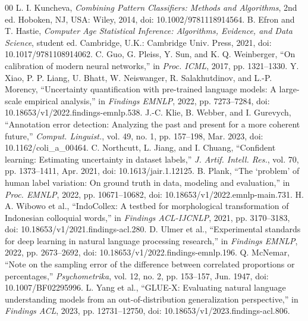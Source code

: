 \begin{thebibliography}{00}
 L. I. Kuncheva, \emph{Combining Pattern Classifiers: Methods and Algorithms}, 2nd ed. Hoboken, NJ, USA: Wiley, 2014, doi: 10.1002/9781118914564.
 B. Efron and T. Hastie, \emph{Computer Age Statistical Inference: Algorithms, Evidence, and Data Science}, student ed. Cambridge, U.K.: Cambridge Univ. Press, 2021, doi: 10.1017/9781108914062.
 C. Guo, G. Pleiss, Y. Sun, and K. Q. Weinberger, ``On calibration of modern neural networks,'' in \emph{Proc. ICML}, 2017, pp. 1321--1330.
 Y. Xiao, P. P. Liang, U. Bhatt, W. Neiswanger, R. Salakhutdinov, and L.-P. Morency, ``Uncertainty quantification with pre-trained language models: A large-scale empirical analysis,'' in \emph{Findings EMNLP}, 2022, pp. 7273--7284, doi: 10.18653/v1/2022.findings-emnlp.538.
 J.-C. Klie, B. Webber, and I. Gurevych, ``Annotation error detection: Analyzing the past and present for a more coherent future,'' \emph{Comput. Linguist.}, vol. 49, no. 1, pp. 157--198, Mar. 2023, doi: 10.1162/coli\_a\_00464.
 C. Northcutt, L. Jiang, and I. Chuang, ``Confident learning: Estimating uncertainty in dataset labels,'' \emph{J. Artif. Intell. Res.}, vol. 70, pp. 1373--1411, Apr. 2021, doi: 10.1613/jair.1.12125.
 B. Plank, ``The `problem' of human label variation: On ground truth in data, modeling and evaluation,'' in \emph{Proc. EMNLP}, 2022, pp. 10671--10682, doi: 10.18653/v1/2022.emnlp-main.731.
 H. A. Wibowo et al., ``IndoCollex: A testbed for morphological transformation of Indonesian colloquial words,'' in \emph{Findings ACL-IJCNLP}, 2021, pp. 3170--3183, doi: 10.18653/v1/2021.findings-acl.280.
 D. Ulmer et al., ``Experimental standards for deep learning in natural language processing research,'' in \emph{Findings EMNLP}, 2022, pp. 2673--2692, doi: 10.18653/v1/2022.findings-emnlp.196.
 Q. McNemar, ``Note on the sampling error of the difference between correlated proportions or percentages,'' \emph{Psychometrika}, vol. 12, no. 2, pp. 153--157, Jun. 1947, doi: 10.1007/BF02295996.
 L. Yang et al., ``GLUE-X: Evaluating natural language understanding models from an out-of-distribution generalization perspective,'' in \emph{Findings ACL}, 2023, pp. 12731--12750, doi: 10.18653/v1/2023.findings-acl.806.
\end{thebibliography}
